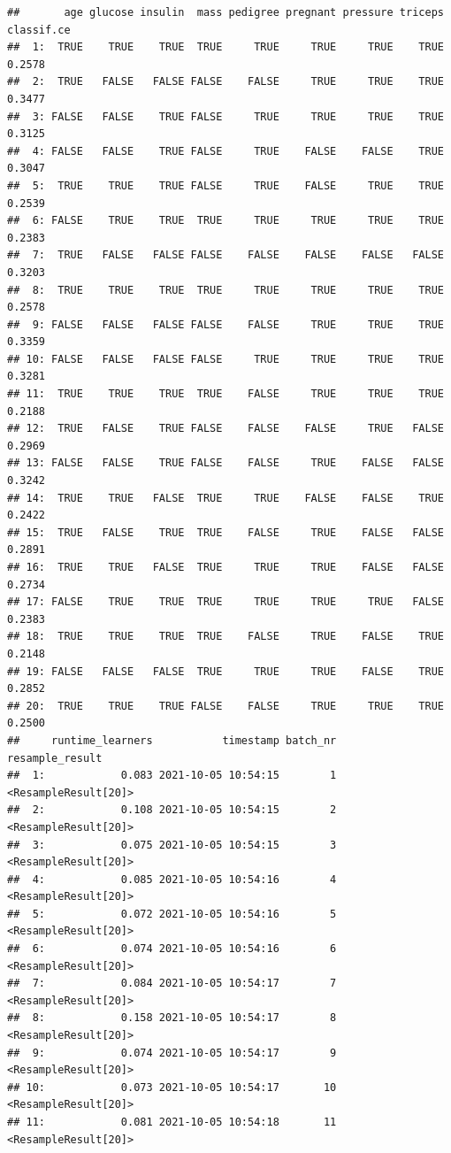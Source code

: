 \documentclass[
]{scrbook}
\begin{document}
\begin{verbatim}
##       age glucose insulin  mass pedigree pregnant pressure triceps classif.ce
##  1:  TRUE    TRUE    TRUE  TRUE     TRUE     TRUE     TRUE    TRUE     0.2578
##  2:  TRUE   FALSE   FALSE FALSE    FALSE     TRUE     TRUE    TRUE     0.3477
##  3: FALSE   FALSE    TRUE FALSE     TRUE     TRUE     TRUE    TRUE     0.3125
##  4: FALSE   FALSE    TRUE FALSE     TRUE    FALSE    FALSE    TRUE     0.3047
##  5:  TRUE    TRUE    TRUE FALSE     TRUE    FALSE     TRUE    TRUE     0.2539
##  6: FALSE    TRUE    TRUE  TRUE     TRUE     TRUE     TRUE    TRUE     0.2383
##  7:  TRUE   FALSE   FALSE FALSE    FALSE    FALSE    FALSE   FALSE     0.3203
##  8:  TRUE    TRUE    TRUE  TRUE     TRUE     TRUE     TRUE    TRUE     0.2578
##  9: FALSE   FALSE   FALSE FALSE    FALSE     TRUE     TRUE    TRUE     0.3359
## 10: FALSE   FALSE   FALSE FALSE     TRUE     TRUE     TRUE    TRUE     0.3281
## 11:  TRUE    TRUE    TRUE  TRUE    FALSE     TRUE     TRUE    TRUE     0.2188
## 12:  TRUE   FALSE    TRUE FALSE    FALSE    FALSE     TRUE   FALSE     0.2969
## 13: FALSE   FALSE    TRUE FALSE    FALSE     TRUE    FALSE   FALSE     0.3242
## 14:  TRUE    TRUE   FALSE  TRUE     TRUE    FALSE    FALSE    TRUE     0.2422
## 15:  TRUE   FALSE    TRUE  TRUE    FALSE     TRUE    FALSE   FALSE     0.2891
## 16:  TRUE    TRUE   FALSE  TRUE     TRUE     TRUE    FALSE   FALSE     0.2734
## 17: FALSE    TRUE    TRUE  TRUE     TRUE     TRUE     TRUE   FALSE     0.2383
## 18:  TRUE    TRUE    TRUE  TRUE    FALSE     TRUE    FALSE    TRUE     0.2148
## 19: FALSE   FALSE   FALSE  TRUE     TRUE     TRUE    FALSE    TRUE     0.2852
## 20:  TRUE    TRUE    TRUE FALSE    FALSE     TRUE     TRUE    TRUE     0.2500
##     runtime_learners           timestamp batch_nr      resample_result
##  1:            0.083 2021-10-05 10:54:15        1 <ResampleResult[20]>
##  2:            0.108 2021-10-05 10:54:15        2 <ResampleResult[20]>
##  3:            0.075 2021-10-05 10:54:15        3 <ResampleResult[20]>
##  4:            0.085 2021-10-05 10:54:16        4 <ResampleResult[20]>
##  5:            0.072 2021-10-05 10:54:16        5 <ResampleResult[20]>
##  6:            0.074 2021-10-05 10:54:16        6 <ResampleResult[20]>
##  7:            0.084 2021-10-05 10:54:17        7 <ResampleResult[20]>
##  8:            0.158 2021-10-05 10:54:17        8 <ResampleResult[20]>
##  9:            0.074 2021-10-05 10:54:17        9 <ResampleResult[20]>
## 10:            0.073 2021-10-05 10:54:17       10 <ResampleResult[20]>
## 11:            0.081 2021-10-05 10:54:18       11 <ResampleResult[20]>

\end{verbatim}
\end{document}

